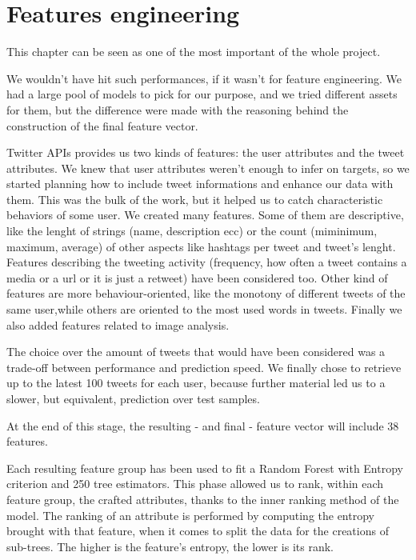 \chapter{Features engineering}
\label{capitolo4}
\thispagestyle{empty}

This chapter can be seen as one of the most important of the whole project.

We wouldn't have hit such performances, if it wasn't for feature engineering. We had a large pool of models to pick for our purpose,  and we tried different assets for them, but the difference were made with the reasoning behind the construction of the final feature vector.

Twitter APIs provides us two kinds of features: the user attributes and the tweet attributes.
We knew that user attributes weren't enough to infer on targets, so we started planning how to include tweet informations and enhance our data with them. This was the bulk of the work, but it helped us to catch characteristic behaviors of some user.
We created many features. Some of them are descriptive, like the lenght of strings (name, description ecc) or the count (miminimum, maximum, average) of other aspects like hashtags per tweet and tweet's lenght. Features describing the tweeting activity (frequency, how often a tweet contains a media or a url or it is just a retweet) have been considered too.
Other kind of features are more behaviour-oriented, like the monotony of different tweets of the same user,while others are oriented to the most used words in tweets.
Finally we also added features related to image analysis.

The choice over the amount of tweets that would have been considered was a trade-off between performance and prediction speed.
We finally chose to retrieve up to the latest 100 tweets for each user, because further material led us to a slower, but equivalent, prediction over test samples.

At the end of this stage, the resulting - and final - feature vector will include 38 features.

Each resulting feature group has been used to fit a Random Forest with Entropy criterion and 250 tree estimators. This phase allowed us to rank, within each feature group, the crafted attributes, thanks to the inner ranking method of the model.
The ranking of an attribute is performed by computing the entropy brought with that feature, when it comes to split the data for the creations of sub-trees. The higher is the feature's entropy, the lower is its rank.

